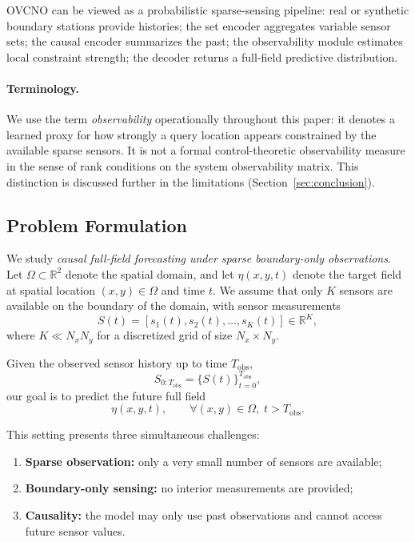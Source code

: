\documentclass[11pt,a4paper]{article}
\begin{document}
OVCNO can be viewed as a probabilistic sparse-sensing pipeline: real or synthetic boundary stations provide histories; the set encoder aggregates variable sensor sets; the causal encoder summarizes the past; the observability module estimates local constraint strength; the decoder returns a full-field predictive distribution.

\paragraph{Terminology.} We use the term \emph{observability} operationally throughout this paper: it denotes a learned proxy for how strongly a query location appears constrained by the available sparse sensors. It is not a formal control-theoretic observability measure in the sense of rank conditions on the system observability matrix. This distinction is discussed further in the limitations (Section~\ref{sec:conclusion}).

\subsection{Problem Formulation}

We study \emph{causal full-field forecasting under sparse boundary-only observations}. Let $\Omega \subset \mathbb{R}^2$ denote the spatial domain, and let $\eta(x,y,t)$ denote the target field at spatial location $(x,y)\in\Omega$ and time $t$. We assume that only $K$ sensors are available on the boundary of the domain, with sensor measurements
\begin{equation}
S(t) = [s_1(t), s_2(t), \dots, s_K(t)] \in \mathbb{R}^K,
\end{equation}
where $K \ll N_x N_y$ for a discretized grid of size $N_x \times N_y$.

Given the observed sensor history up to time $T_{\mathrm{obs}}$,
\begin{equation}
S_{0:T_{\mathrm{obs}}} = \{S(t)\}_{t=0}^{T_{\mathrm{obs}}},
\end{equation}
our goal is to predict the future full field
\begin{equation}
\eta(x,y,t), \qquad \forall (x,y)\in\Omega,\; t > T_{\mathrm{obs}}.
\end{equation}

This setting presents three simultaneous challenges:
\begin{enumerate}
    \item \textbf{Sparse observation:} only a very small number of sensors are available;
    \item \textbf{Boundary-only sensing:} no interior measurements are provided;
    \item \textbf{Causality:} the model may only use past observations and cannot access future sensor values.
\end{enumerate}
\end{document}
